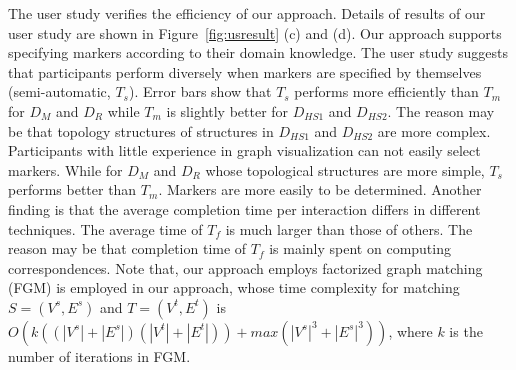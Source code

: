 {The user study verifies the efficiency of our approach. Details of results of our user study are shown in Figure~\ref{fig:usresult} (c) and (d). Our approach supports specifying markers according to their domain knowledge. The user study suggests that participants perform diversely when markers are specified by themselves (semi-automatic, $T_s$). Error bars show that $T_s$ performs more efficiently than $T_m$ for $D_M$ and $D_R$ while $T_m$ is slightly better for $D_{HS1}$ and $D_{HS2}$. The reason may be that topology structures of structures in $D_{HS1}$ and $D_{HS2}$ are more complex. Participants with little experience in graph visualization can not easily select markers.
While for $D_M$ and $D_R$ whose topological structures are more simple, $T_s$ performs better than $T_m$. Markers are more easily to be determined. Another finding is that the average completion time per interaction differs in different techniques. The average time of $T_f$ is much larger than those of others.
The reason may be that completion time of $T_f$ is mainly spent on computing correspondences. Note that, our approach employs factorized graph matching (FGM) is employed in our approach, whose time complexity for matching $S=(V^s, E^s)$ and $T=(V^t, E^t)$ is $O(k((|V^s| + |E^s|)(|V^t| + |E^t|)) + max(|V^s|^3 + |E^s|^3))$, where $k$ is the number of iterations in FGM. 
}


